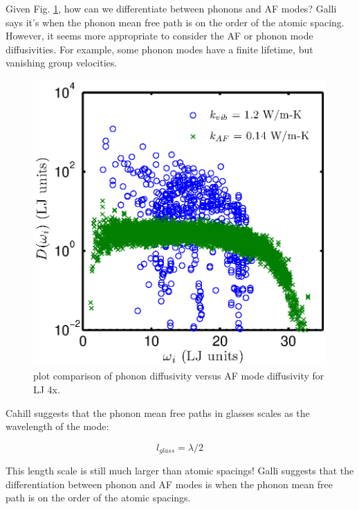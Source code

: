\documentclass[letterpaper,12pt]{article}
\begin{document}
Given Fig. \ref{F:phonon_diff}, how can we differentiate between phonons and AF modes?  Galli says it's when the phonon mean free path is on the order of the atomic spacing.  However, it seems more appropriate to consider the AF or phonon mode diffusivities.  For example, some phonon modes have a finite lifetime, but vanishing group velocities.   

\begin{figure}
\begin{center}
\includegraphics[scale=0.5]{phonon_diff.eps}
\vspace*{-5mm}
\end{center}
\caption{\label{F:phonon_diff} plot comparison of phonon diffusivity versus AF mode diffusivity for LJ 4x.}
\end{figure}

Cahill\cite{PhysRevB.46.6131} suggests that the phonon mean free paths in glasses scales as the wavelength of the mode:

\begin{equation}\label{EQ:M:l_glass}
l_{glass} =  \lambda /2
\end{equation}

This length scale is still much larger than atomic spacings! Galli suggests that the differentiation between phonon and AF modes is when the phonon mean free path is on the order of the atomic spacings. 
\end{document}
